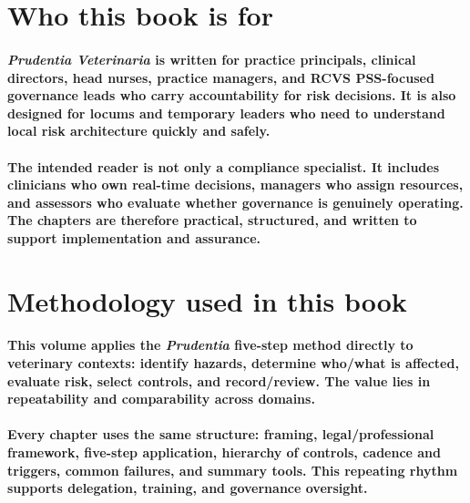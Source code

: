 \section{Who this book is for}

\paragraph{\textit{Prudentia Veterinaria} is written for practice principals, clinical directors, head nurses, practice managers, and RCVS PSS-focused governance leads who carry accountability for risk decisions. It is also designed for locums and temporary leaders who need to understand local risk architecture quickly and safely.}

\paragraph{The intended reader is not only a compliance specialist. It includes clinicians who own real-time decisions, managers who assign resources, and assessors who evaluate whether governance is genuinely operating. The chapters are therefore practical, structured, and written to support implementation and assurance.}

\section{Methodology used in this book}

\paragraph{This volume applies the \textit{Prudentia} five-step method directly to veterinary contexts: identify hazards, determine who/what is affected, evaluate risk, select controls, and record/review. The value lies in repeatability and comparability across domains.}

\paragraph{Every chapter uses the same structure: framing, legal/professional framework, five-step application, hierarchy of controls, cadence and triggers, common failures, and summary tools. This repeating rhythm supports delegation, training, and governance oversight.}

